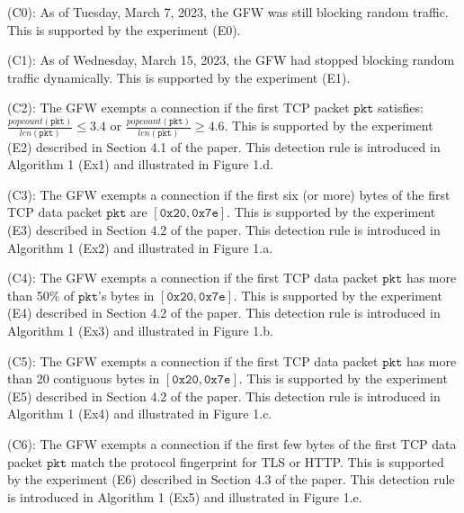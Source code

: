\begin{compactdesc}
    \item[(C0):] \textit{}
    As of Tuesday, March 7, 2023, the GFW was still blocking random traffic.
    This is supported by the experiment (E0).

    \item[(C1):] \textit{}
    As of Wednesday, March 15, 2023,
    the GFW had stopped blocking random traffic dynamically.
    This is supported by the experiment (E1).

    \item[(C2):] \textit{}
    The GFW exempts a connection if
    the first TCP packet $\mathtt{pkt}$ satisfies:
    $\frac{\mathit{popcount}(\mathtt{pkt})}{\mathit{len}(\mathtt{pkt})} \le 3.4$ or 
    $\frac{\mathit{popcount}(\mathtt{pkt})}{\mathit{len}(\mathtt{pkt})} \ge 4.6$. 
    This is supported by the experiment (E2) described in Section 4.1 of the paper. 
    This detection rule is introduced in Algorithm 1 (Ex1)
    and illustrated in Figure 1.d.

    \item[(C3):] \textit{}
    The GFW exempts a connection if
    the first six (or more) bytes of the first TCP data packet $\mathtt{pkt}$ are 
    $[\mathtt{0x20},\mathtt{0x7e}]$. 
    This is supported by the experiment (E3) described in Section 4.2 of the paper. 
    This detection rule is introduced in Algorithm 1 (Ex2)
    and illustrated in Figure 1.a.

    \item[(C4):] \textit{}
    The GFW exempts a connection if 
    the first TCP data packet $\mathtt{pkt}$ has 
    more than 50\% of $\mathtt{pkt}$'s bytes in $[\mathtt{0x20},\mathtt{0x7e}]$. 
    This is supported by the experiment (E4) described in Section 4.2 of the paper. 
    This detection rule is introduced in Algorithm 1 (Ex3)
    and illustrated in Figure 1.b.

    \item[(C5):] \textit{}
    The GFW exempts a connection if 
    the first TCP data packet $\mathtt{pkt}$ has 
    more than 20 contiguous bytes in
    $[\mathtt{0x20},\mathtt{0x7e}]$. 
    This is supported by the experiment (E5) described in Section 4.2 of the paper. 
    This detection rule is introduced in Algorithm 1 (Ex4)
    and illustrated in Figure 1.c.

    \item[(C6):] \textit{}
    The GFW exempts a connection if 
    the first few bytes of the first TCP data packet $\mathtt{pkt}$
    match the protocol fingerprint for TLS or HTTP.
    This is supported by the experiment (E6) described in Section 4.3 of the paper. 
    This detection rule is introduced in Algorithm 1 (Ex5)
    and illustrated in Figure 1.e.

\end{compactdesc}

